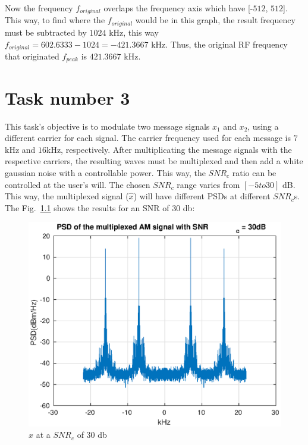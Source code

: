 \documentclass[
	12pt,				%
	openright,			%
	oneside,			%
	a4paper,			%
	chapter=TITLE,		%
	english,			%
	french,				%
	spanish,			%
	brazil				%
	]{abntex2}
\theoremstyle{definition}
\begin{document}
Now the frequency $f_{original}$ overlaps the frequency axis which have [-$512$, $512$]. This way, to find where the  $f_{original}$ would be in this graph, the result frequency must be subtracted by $1024$ kHz, this way $f_{original} = 602.6333 -1024 = -421.3667$ kHz. Thus, the original RF frequency that originated $f_{peak}$ is $421.3667$ kHz.

\chapter{Task number 3}
\label{cap:deselvolvimento}

This task's objective is to modulate two message signals $x_1$ and $x_2$, using a different carrier for each signal.
The carrier frequency used for each message is $7$kHz and $16$kHz, respectively.
After multiplicating the message signals with the respective carriers, the resulting waves must be multiplexed and then add a white gaussian noise with a controllable power. This way, the $SNR_c$ ratio can be controlled at the user's will. The chosen $SNR_c$ range varies from $[-5 to 30]$ dB. This way, the multiplexed signal ($\hat{x}$) will have different PSDs at different $SNR_c$s. The Fig.~\ref{fig:multi_30} shows the results for an SNR of 30 db:

\begin{figure}[h!]
	\centering
	\includegraphics{imagens/multiplexed_30db.eps}
	\caption{$\hat{x}$ at a $SNR_c$ of 30 db}
	\label{fig:multi_30}
\end{figure}
\end{document}
